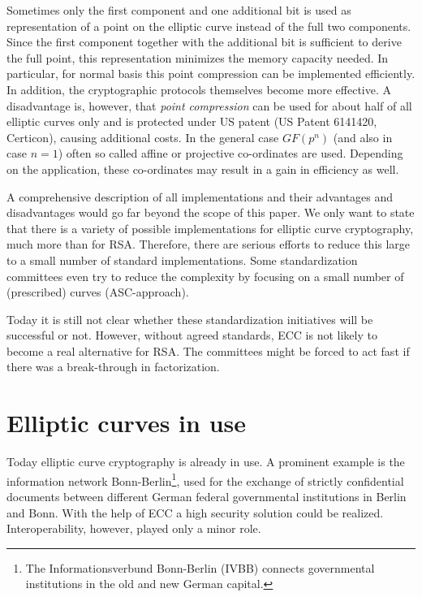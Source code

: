 Sometimes only the first component and one additional bit is used as representation of a point on the elliptic curve instead of the full two components. Since the first component together with the additional bit is sufficient to derive the full point, this representation minimizes the memory capacity needed. In particular, for normal basis this point compression can be implemented efficiently. In addition, the cryptographic protocols themselves become more effective. A disadvantage is, however, that {\it point compression} can be used for about half of all elliptic curves only and is protected under
US patent (US Patent 6141420, Certicon), causing additional costs.
In the general case $GF(p^n)$ (and also in case $n=1$) often so called affine or projective co-ordinates are used. Depending on the application, these co-ordinates may result in a gain in efficiency as well.

A comprehensive description of all implementations and their advantages and disadvantages would go far beyond the scope of this paper. We only want to state that there is a variety of possible implementations for elliptic curve cryptography, much more than for RSA. Therefore, there are serious efforts to reduce this large to a small number of standard implementations. Some standardization committees even try to reduce the complexity by focusing on a small number of (prescribed) curves (ASC-approach).

Today it is still not clear whether these standardization initiatives will be
successful or not. However, without agreed standards, ECC is not likely to
become a real alternative for RSA. The committees might be forced to act fast
if there was a break-through in factorization.


\section{Elliptic curves in use}

Today elliptic curve cryptography is already in use. A prominent example is the information network Bonn-Berlin\footnote{The Informationsverbund Bonn-Berlin (IVBB) connects governmental institutions in the old and new German capital.}, used for the exchange of strictly confidential documents between different German federal governmental institutions in Berlin and Bonn. With the help of ECC a high security solution could be realized. Interoperability, however, played only a minor role.

